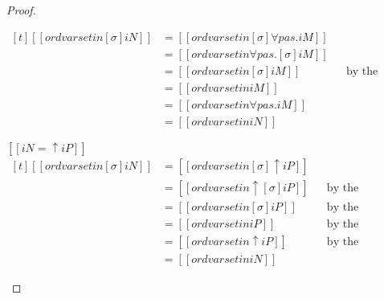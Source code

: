 \begin{proof}
\begin{caseof}
      $\begin{aligned}[t]
         [[ ord varset in [σ]iN ]] &= [[ ord varset in [σ]∀pas.iM ]] \\
                                   &= [[ ord varset in ∀pas.[σ]iM ]]\\
                                   &= [[ ord varset in [σ]iM ]]
                                   && \text{by the induction hypothesis}\\
                                   &= [[ ord varset in iM ]]\\
                                   &= [[ ord varset in ∀pas.iM ]]\\
                                   &= [[ ord varset in iN ]]
       \end{aligned}$
    \item $[[iN = ↑iP]]$\\
       $\begin{aligned}[t]
        [[ ord varset in [σ]iN ]] &= [[ ord varset in [σ]↑iP ]] \\
                                   &= [[ ord varset in ↑[σ]iP ]]
                                   && \text{by the definition of substitution}\\
                                   &= [[ ord varset in [σ]iP ]]
                                   && \text{by the induction hypothesis}\\
                                   &= [[ ord varset in iP ]]
                                   && \text{by the definition of substitution}\\
                                   &= [[ ord varset in ↑iP ]]
                                   && \text{by the definition of ordering}\\
                                   &= [[ ord varset in iN ]]
       \end{aligned} $


\end{caseof}
\end{proof}
